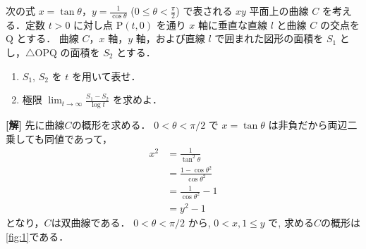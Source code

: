 \documentclass[a4paper,10pt]{ltjsarticle}
\begin{document}
\begin{oframed}
  次の式 $x = \tan\theta$，$y = \frac{1}{\cos\theta}$ ($0 \le \theta < \frac{\pi}{2}$) で表される $xy$ 平面上の曲線 $C$ を考え
  る．定数 $t>0$ に対し点 P$(t,0)$ を通り $x$ 軸に垂直な直線 $l$ と曲線 $C$ の交点を Q とする．
  曲線 $C$，$x$ 軸，$y$ 軸，および直線 $l$ で囲まれた図形の面積を $S_1$ とし，$\triangle$OPQ の面積を $S_2$ とする．
  \begin{enumerate}
    \item $S_1$, $S_2$ を $t$ を用いて表せ．
    \item 極限 $\displaystyle\lim_{t \to \infty} \frac{S_1 - S_2}{\log t}$ を求めよ．
  \end{enumerate}
\end{oframed}

\setlength{\columnseprule}{0.4pt}
\begin{multicols}{2}
  {\bf[解]}
  先に曲線$C$の概形を求める．
  $0 < \theta < \pi/2$ で $x=\tan\theta$ は非負だから両辺二乗しても同値であって，
  \begin{align*}
    x^2
     & = \frac{1}{\tan^2 \theta}             \\
     & = \frac{1-\cos\theta^2}{\cos\theta^2} \\
     & = \frac{1}{\cos\theta^2}-1            \\
     & = y^2-1
  \end{align*}
  となり，$C$は双曲線である．
  $0 < \theta < \pi/2$ から, $0 < x, 1 \leq y$ で,
  求める$C$の概形は\cref{fig:1}である．

  \begin{figure}[H]
\end{figure}
\end{multicols}
\end{document}
